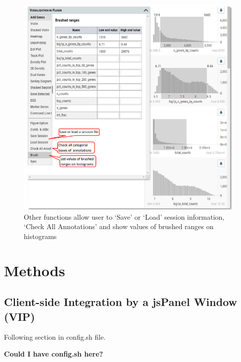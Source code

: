 \documentclass[
]{article}
\newenvironment{Shaded}{\begin{snugshade}}{\end{snugshade}}
\begin{document}
\begin{figure}
\centering
\includegraphics{figures/F23.jpg}
\caption{Other functions allow user to `Save' or `Load' session information, `Check All Annotations' and show values of brushed ranges on histograms}
\end{figure}

\hypertarget{methods}{%
\section{Methods}\label{methods}}

\hypertarget{client-side-integration-by-a-jspanel-window-vip}{%
\subsection*{Client-side Integration by a jsPanel Window (VIP)}\label{client-side-integration-by-a-jspanel-window-vip}}

Following section in config.sh file.

\textbf{
Could I have config.sh here?
}

\begin{Shaded}
\begin{Highlighting}[]

\end{Highlighting}
\end{Shaded}
\end{document}

